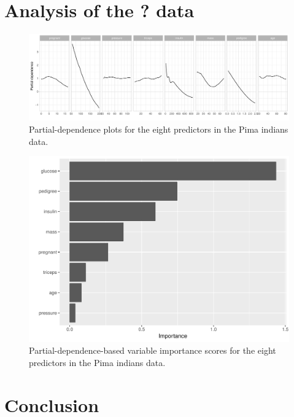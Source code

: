 \documentclass[12pt]{article}
\begin{document}
\section{Analysis of the ? data}

\begin{figure}[!htb]
  \label{pima-pdps}
  \centering
  \includegraphics[width=1.0\textwidth]{pima-pdps}
  \caption{Partial-dependence plots for the eight predictors in the Pima indians data.}
\end{figure}


\begin{figure}[!htb]
  \label{pima-vip}
  \centering
  \includegraphics[width=1.0\textwidth]{pima-vip}
  \caption{Partial-dependence-based variable importance scores for the eight predictors in the Pima indians data.}
\end{figure}


\section{Conclusion}
\label{sec:conc}
\end{document}
